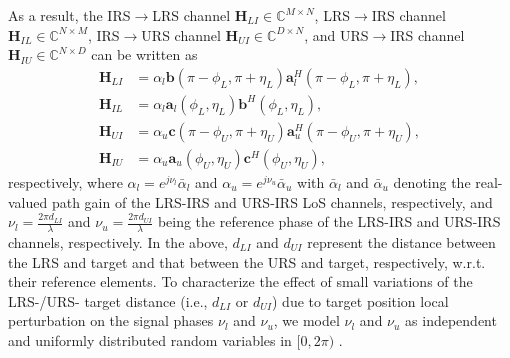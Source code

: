 \documentclass[10pt,final,doublecolumn]{IEEEtran}
\begin{document}
As a result, the IRS$\rightarrow$LRS channel $\mathbf{H}_{LI}\in \mathbb{C}^{M\times N}$, LRS$\rightarrow$IRS channel $\mathbf{H}_{IL}\in \mathbb{C}^{N\times{M}}$, IRS$\rightarrow$URS channel $\mathbf{H}_{UI}\in \mathbb{C}^{D\times{N}}$, and URS$\rightarrow$IRS channel $\mathbf{H}_{IU}\in \mathbb{C}^{N\times{D}}$ can be written as
\begin{align}\label{LL}
 \mathbf{H}_{LI}&=\alpha_l\mathbf{b}(\pi-{\phi}_{{L}},\pi+{\eta}_{{L}})\mathbf{a}_{{l}}^H(\pi-{\phi}_{{L}},\pi+{\eta}_{{L}}), \\
\mathbf{H}_{IL}&=\alpha_l\mathbf{a}_{{l}}({\phi}_{{L}},{\eta}_{{L}})\mathbf{b}^H({\phi}_{{L}},{\eta}_{{L}}),\\
\mathbf{H}_{UI}&=\alpha_u\mathbf{c}(\pi-{\phi}_{{U}},\pi+{\eta}_{{U}})\mathbf{a}_{{u}}^H(\pi-{\phi}_{{U}},\pi+{\eta}_{{U}}),\\
\mathbf{H}_{IU}&=\alpha_u\mathbf{a}_{{u}}({\phi}_{{U}},{\eta}_{{U}})\mathbf{c}^H({\phi}_{{U}},{\eta}_{{U}}),
\end{align}
respectively, where $\alpha_l=e^{j\nu_l}\bar{\alpha}_l$ and $\alpha_u=e^{j\nu_u}\bar{\alpha}_u$ with $\bar{\alpha}_l$ and $\bar{\alpha}_u$ denoting the real-valued path gain of the LRS-IRS and URS-IRS LoS channels, respectively, and $\nu_l=\frac{2\pi d_{LI}}{\lambda}$ and $\nu_u=\frac{2\pi d_{UI}}{\lambda}$ being the reference phase of the LRS-IRS and URS-IRS channels, respectively. In the above, $d_{LI}$ and $d_{UI}$ represent the distance between the LRS and target and that between the URS and target, respectively, w.r.t. their reference elements. To characterize the effect of small variations of the LRS-/URS- target distance  (i.e., $d_{LI}$ or $d_{UI}$) due to target position local perturbation on the signal phases $\nu_l$ and $\nu_u$, we model $\nu_l$ and $\nu_u$ as independent and  uniformly distributed random variables in $[0, 2\pi)$ \cite{liang}.
\end{document}
